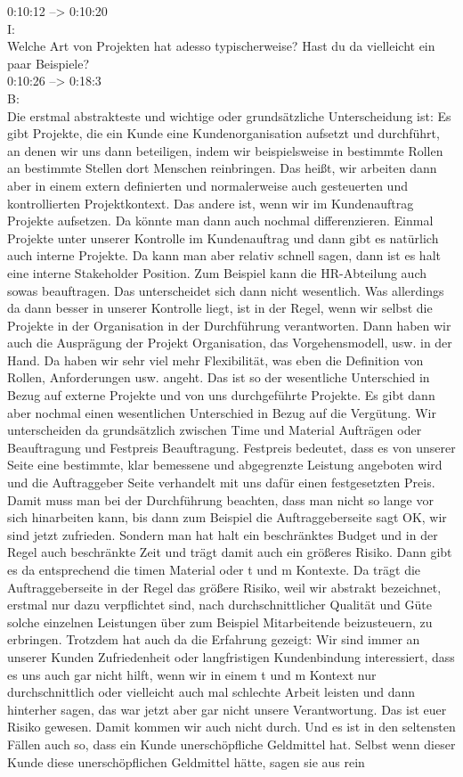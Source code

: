 0:10:12 --> 0:10:20\\
I:\\
Welche Art von Projekten hat adesso typischerweise? Hast du da vielleicht ein paar Beispiele?\\

0:10:26 --> 0:18:3\\
B:\\
Die erstmal abstrakteste und wichtige oder grundsätzliche Unterscheidung ist: Es gibt Projekte, die ein Kunde eine Kundenorganisation aufsetzt und durchführt, an denen wir uns dann beteiligen, indem wir beispielsweise in bestimmte Rollen an bestimmte Stellen dort Menschen reinbringen. Das heißt, wir arbeiten dann aber in einem extern definierten und normalerweise auch gesteuerten und kontrollierten Projektkontext. Das andere ist, wenn wir im Kundenauftrag Projekte aufsetzen. Da könnte man dann auch nochmal differenzieren. Einmal Projekte unter unserer Kontrolle im Kundenauftrag und dann gibt es natürlich auch interne Projekte. Da kann man aber relativ schnell sagen, dann ist es halt eine interne Stakeholder Position. Zum Beispiel kann die HR-Abteilung auch sowas beauftragen. Das unterscheidet sich dann nicht wesentlich. Was allerdings da dann besser in unserer Kontrolle liegt, ist in der Regel, wenn wir selbst die Projekte in der Organisation in der Durchführung verantworten. Dann haben wir auch die Ausprägung der Projekt Organisation, das Vorgehensmodell, usw. in der Hand. Da haben wir sehr viel mehr Flexibilität, was eben die Definition von Rollen, Anforderungen usw. angeht. Das ist so der wesentliche Unterschied in Bezug auf externe Projekte und von uns durchgeführte Projekte. Es gibt dann aber nochmal einen wesentlichen Unterschied in Bezug auf die Vergütung. Wir unterscheiden da grundsätzlich zwischen Time und Material Aufträgen oder Beauftragung und Festpreis Beauftragung. Festpreis bedeutet, dass es von unserer Seite eine bestimmte, klar bemessene und abgegrenzte Leistung angeboten wird und die Auftraggeber Seite verhandelt mit uns dafür einen festgesetzten Preis. Damit muss man bei der Durchführung beachten, dass man nicht so lange vor sich hinarbeiten kann, bis dann zum Beispiel die Auftraggeberseite sagt OK, wir sind jetzt zufrieden. Sondern man hat halt ein beschränktes Budget und in der Regel auch beschränkte Zeit und trägt damit auch ein größeres Risiko. Dann gibt es da entsprechend die timen Material oder t und m Kontexte. Da trägt die Auftraggeberseite in der Regel das größere Risiko, weil wir abstrakt bezeichnet, erstmal nur dazu verpflichtet sind, nach durchschnittlicher Qualität und Güte solche einzelnen Leistungen über zum Beispiel Mitarbeitende beizusteuern, zu erbringen. Trotzdem hat auch da die Erfahrung gezeigt: Wir sind immer an unserer Kunden Zufriedenheit oder langfristigen Kundenbindung interessiert, dass es uns auch gar nicht hilft, wenn wir in einem t und m Kontext nur durchschnittlich oder vielleicht auch mal schlechte Arbeit leisten und dann hinterher sagen, das war jetzt aber gar nicht unsere Verantwortung. Das ist euer Risiko gewesen. Damit kommen wir auch nicht durch. Und es ist in den seltensten Fällen auch so, dass ein Kunde unerschöpfliche Geldmittel hat. Selbst wenn dieser Kunde diese unerschöpflichen Geldmittel hätte, sagen sie aus rein 